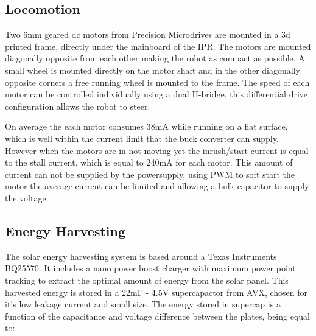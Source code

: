 \documentclass[letterpaper, 10 pt, conference]{ieeeconf}  %
\begin{document}
\subsection{Locomotion}

Two 6mm geared dc motors from Precision Microdrives are mounted in a 3d printed frame, directly under the mainboard of the IPR.
The motors are mounted diagonally opposite from each other making the robot as compact as possible.
A small wheel is mounted directly on the motor shaft and in the other diagonally opposite corners a free running wheel is mounted to the frame.
The speed of each motor can be controlled individually using a dual H-bridge, this differential drive configuration allows the robot to steer.

On average the each motor consumes 38mA while running on a flat surface, which is well within the current limit that the buck converter can supply.
However when the motors are in not moving yet the inrush/start current is equal to the stall current, which is equal to 240mA for each motor.
This amount of current can not be supplied by the powersupply, using PWM to soft start the motor the average current can be limited and allowing a bulk capacitor to supply the voltage.

\subsection{Energy Harvesting}




The solar energy harvesting system is based around a Texas Instruments BQ25570. 
It includes a nano power boost charger with maximum power point tracking to extract the optimal amount of energy from the solar panel. 
This harvested energy is stored in a 22mF - 4.5V supercapactor from AVX, chosen for it's low leakage current and small size.
The energy stored in supercap is a function of the capacitance and voltage difference between the plates, being equal to:
\end{document}
